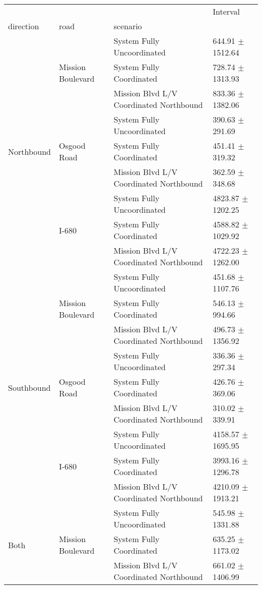 \begin{tabular}{llll}
\toprule
 &  &  & Interval \\
direction & road & scenario &  \\
\midrule
\multirow[t]{9}{*}{Northbound} & \multirow[t]{3}{*}{Mission Boulevard} & System Fully Uncoordinated & 644.91 $\pm$ 1512.64 \\
 &  & System Fully Coordinated & 728.74 $\pm$ 1313.93 \\
 &  & Mission Blvd L/V Coordinated Northbound & 833.36 $\pm$ 1382.06 \\
 & \multirow[t]{3}{*}{Osgood Road} & System Fully Uncoordinated & 390.63 $\pm$ 291.69 \\
 &  & System Fully Coordinated & 451.41 $\pm$ 319.32 \\
 &  & Mission Blvd L/V Coordinated Northbound & 362.59 $\pm$ 348.68 \\
 & \multirow[t]{3}{*}{I-680} & System Fully Uncoordinated & 4823.87 $\pm$ 1202.25 \\
 &  & System Fully Coordinated & 4588.82 $\pm$ 1029.92 \\
 &  & Mission Blvd L/V Coordinated Northbound & 4722.23 $\pm$ 1262.00 \\
\multirow[t]{9}{*}{Southbound} & \multirow[t]{3}{*}{Mission Boulevard} & System Fully Uncoordinated & 451.68 $\pm$ 1107.76 \\
 &  & System Fully Coordinated & 546.13 $\pm$ 994.66 \\
 &  & Mission Blvd L/V Coordinated Northbound & 496.73 $\pm$ 1356.92 \\
 & \multirow[t]{3}{*}{Osgood Road} & System Fully Uncoordinated & 336.36 $\pm$ 297.34 \\
 &  & System Fully Coordinated & 426.76 $\pm$ 369.06 \\
 &  & Mission Blvd L/V Coordinated Northbound & 310.02 $\pm$ 339.91 \\
 & \multirow[t]{3}{*}{I-680} & System Fully Uncoordinated & 4158.57 $\pm$ 1695.95 \\
 &  & System Fully Coordinated & 3993.16 $\pm$ 1296.78 \\
 &  & Mission Blvd L/V Coordinated Northbound & 4210.09 $\pm$ 1913.21 \\
\multirow[t]{9}{*}{Both} & \multirow[t]{3}{*}{Mission Boulevard} & System Fully Uncoordinated & 545.98 $\pm$ 1331.88 \\
 &  & System Fully Coordinated & 635.25 $\pm$ 1173.02 \\
 &  & Mission Blvd L/V Coordinated Northbound & 661.02 $\pm$ 1406.99 \\

\end{tabular}
